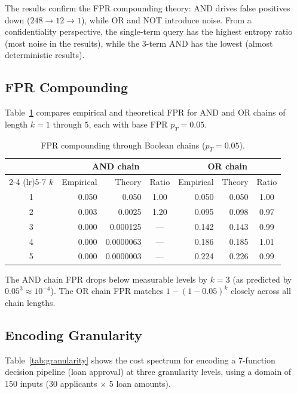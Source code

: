 \documentclass[11pt]{article}
\theoremstyle{definition}
\theoremstyle{plain}
\theoremstyle{remark}
\begin{document}
The results confirm the FPR compounding theory:
AND drives false positives down ($248 \to 12 \to 1$), while OR and NOT
introduce noise.  From a confidentiality perspective, the single-term
query has the highest entropy ratio (most noise in the results), while
the 3-term AND has the lowest (almost deterministic results).

\subsection{FPR Compounding}

Table~\ref{tab:fpr} compares empirical and theoretical FPR for AND and
OR chains of length $k = 1$ through $5$, each with base FPR
$p_T = 0.05$.

\begin{table}[ht]
\centering
\caption{FPR compounding through Boolean chains ($p_T = 0.05$).}
\label{tab:fpr}
\begin{tabular}{@{}crrcrrc@{}}
\toprule
& \multicolumn{3}{c}{AND chain} & \multicolumn{3}{c}{OR chain} \\
\cmidrule(lr){2-4} \cmidrule(lr){5-7}
$k$ & Empirical & Theory & Ratio & Empirical & Theory & Ratio \\
\midrule
1 & 0.050 & 0.050 & 1.00 & 0.050 & 0.050 & 1.00 \\
2 & 0.003 & 0.0025 & 1.20 & 0.095 & 0.098 & 0.97 \\
3 & 0.000 & 0.000125 & --- & 0.142 & 0.143 & 0.99 \\
4 & 0.000 & 0.0000063 & --- & 0.186 & 0.185 & 1.01 \\
5 & 0.000 & 0.0000003 & --- & 0.224 & 0.226 & 0.99 \\
\bottomrule
\end{tabular}
\end{table}

The AND chain FPR drops below measurable levels by $k = 3$ (as
predicted by $0.05^3 \approx 10^{-4}$).  The OR chain FPR matches
$1 - (1 - 0.05)^k$ closely across all chain lengths.

\subsection{Encoding Granularity}

Table~\ref{tab:granularity} shows the cost spectrum for encoding
a 7-function decision pipeline (loan approval) at three granularity
levels, using a domain of 150 inputs (30 applicants $\times$ 5 loan
amounts).
\end{document}
